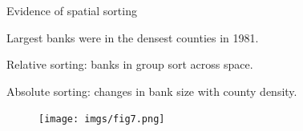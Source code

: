\documentclass[notes,10pt, aspectratio=169]{beamer}
\newenvironment{wideitemize}{\itemize\addtolength{\itemsep}{10pt}}{\enditemize}
\begin{document}
\begin{frame}{Evidence of spatial sorting}


            \begin{wideitemize}
                \item Largest banks were in the densest counties in 1981.
                \item Relative sorting: banks in group sort across space.
                \item Absolute sorting: changes in bank size with county density.
        \end{wideitemize}

    \begin{figure}
        \centering
        \texttt{[image: imgs/fig7.png]}
        \label{fig:my_label}
    \end{figure}
    
    \end{frame}
\end{document}
